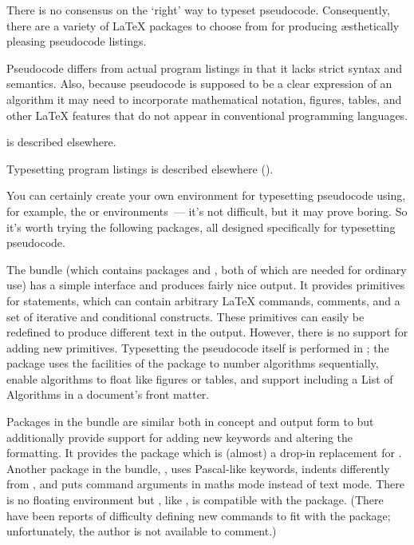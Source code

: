 
There is no consensus on the `right' way to typeset pseudocode.
Consequently, there are a variety of \LaTeX{} packages to choose from
for producing \ae{}sthetically pleasing pseudocode listings.

Pseudocode differs from actual program listings in that it lacks
strict syntax and semantics.  Also, because pseudocode is supposed to
be a clear expression of an algorithm it may need to incorporate
mathematical notation, figures, tables, and other \LaTeX{} features
that do not appear in conventional programming languages.
\begin{wideversion} %
   is described
  elsewhere.
\end{wideversion}
\begin{narrowversion} %
  Typesetting program listings is described elsewhere
  ().
\end{narrowversion}

You can certainly create your own environment for typesetting
pseudocode using, for example, the  or
 environments~--- it's not difficult, but it may
prove boring.  So it's worth trying the following packages, all
designed specifically for typesetting pseudocode.

The  bundle (which contains packages
 and , both of which are
needed for ordinary use) has a simple interface and produces fairly
nice output.  It provides primitives for statements, which can contain
arbitrary \LaTeX{} commands, comments, and a set of iterative and
conditional constructs.  These primitives can easily be redefined to
produce different text in the output.  However, there is no support
for adding new primitives.  Typesetting the pseudocode itself is
performed in ; the  package
uses the facilities of the  package to number
algorithms sequentially, enable algorithms to float like figures or
tables, and support including a List of Algorithms in a document's
front matter.

Packages in the  bundle are similar both in
concept and output form to  but additionally
provide support for adding new keywords and altering the formatting.
It provides the  package which is (almost) a
drop-in replacement for .  Another package in the
bundle, , uses Pascal-like keywords, indents
differently from , and puts command arguments
in maths mode instead of text mode.  There is no floating environment
but , like , is compatible
with the  package.  (There have been reports of
difficulty defining new commands to fit with the package;
unfortunately, the author is not available to comment.)

